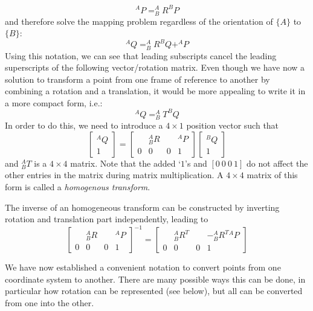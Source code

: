 \begin{equation}
^AP=^A_BR^BP
\end{equation}
%
and therefore solve the mapping problem regardless of the orientation of $\{A\}$ to $\{B\}$:
\begin{equation}
^AQ=^A_BR^BQ+^AP
\end{equation}
Using this notation, we can see that leading subscripts cancel the leading superscripts of the following vector/rotation matrix.
Even though we have now a solution to transform a point from one frame of reference to another by combining a rotation and a translation, it would be more appealing to write it in a more compact form, i.e.:
\begin{equation}
^AQ=^A_BT^BQ
\end{equation}
In order to do this, we need to introduce a $4\times1$ position vector such that
\begin{equation}
\left[\begin{array}{c}^AQ\\1\end{array}\right]=\left[\begin{array}{ccc|c} & ^A_BR & & ^AP \\\hline 0 & 0 & 0 & 1\end{array}\right]\left[\begin{array}{c}^BQ\\1\end{array}\right]
\end{equation}
and $^A_BT$ is a $4\times4$ matrix.  Note that the added `$1$'s and $ [0\ 0\ 0\ 1]$ do not affect the other entries in the matrix during matrix multiplication. A $4\times4$ matrix of this form is called a \emph{homogenous transform}.

The inverse of an homogeneous transform can be constructed by inverting rotation and translation part independently, leading to
\begin{equation}
\left[\begin{array}{ccc|c} & ^A_BR & & ^AP \\\hline 0 & 0 & 0 & 1\end{array}\right]^{-1}=
\left[\begin{array}{ccc|c} & ^A_BR^T & & -^A_B{R^T}{^AP} \\\hline 0 & 0 & 0 & 1\end{array}\right]
\end{equation}

We have now established a convenient notation to convert points from one coordinate system to another. There are many possible ways this can be done, in particular how rotation can be represented (see below), but all can be converted from one into the other.

